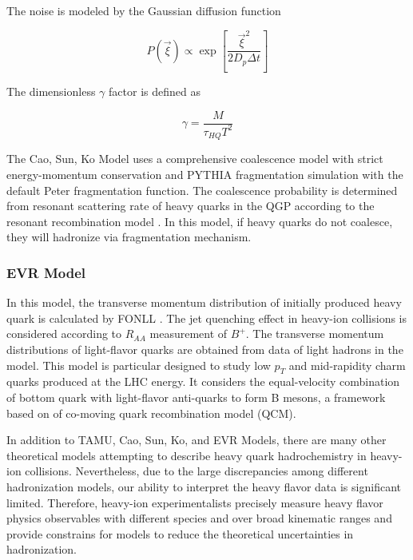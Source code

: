 The noise is modeled by the Gaussian diffusion function 

\begin{equation}
P(\vec{\xi}) \propto \exp[\frac{\vec{\xi}^2}{2D_p \Delta t}]
\end{equation}

The dimensionless $\gamma$ factor is defined as

\begin{equation}
\gamma = \frac{M}{\tau_{HQ} T^2}
\end{equation}


The Cao, Sun, Ko Model uses a comprehensive coalescence model with strict energy-momentum conservation and PYTHIA fragmentation simulation \cite{PYTHIAFrag} with the default Peter fragmentation function. The coalescence probability is determined from resonant scattering rate of heavy quarks in the QGP according to the resonant recombination model \cite{RRM1,RRM2}. In this model, if heavy quarks do not coalesce, they will hadronize via fragmentation mechanism.



 
\subsubsection{EVR Model}

In this model, the transverse momentum distribution of initially produced heavy quark is calculated by FONLL \cite{QCMModel}. The jet quenching effect in heavy-ion collisions is considered according to $R_{AA}$ measurement of $B^+$. The transverse momentum distributions of light-flavor quarks are obtained from data of light hadrons in the model. This model is particular designed to study low $p_T$ and mid-rapidity charm quarks produced at the LHC energy. It considers the equal-velocity combination of bottom quark with light-flavor anti-quarks  to form B mesons, a framework based on of co-moving quark recombination model (QCM).


In addition to TAMU, Cao, Sun, Ko, and EVR Models, there are many other theoretical models attempting to describe heavy quark hadrochemistry in heavy-ion collisions. Nevertheless, due to the large discrepancies among different hadronization models, our ability to interpret the heavy flavor data is significant limited. Therefore, heavy-ion experimentalists precisely measure heavy flavor physics observables with different species and over broad kinematic ranges and provide constrains for models to reduce the theoretical uncertainties in hadronization.


